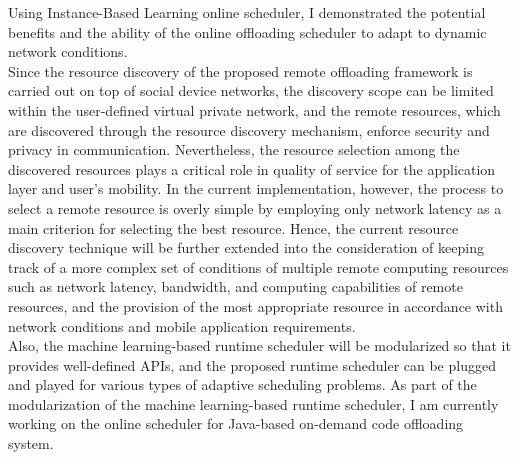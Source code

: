 %
Using Instance-Based Learning online scheduler, I demonstrated
the potential benefits and the ability of the online offloading
scheduler to adapt to dynamic network conditions.\\
%
Since the resource discovery of the proposed remote offloading framework
is carried out on top of social device networks, the discovery scope
can be limited within the user-defined virtual private network, and the
remote resources, which are discovered through the resource discovery
mechanism, enforce security and privacy in communication.
%
Nevertheless, the resource selection among the discovered resources
plays a critical role in quality of service for the application layer
and user's mobility.
%
In the current implementation, however, the process to select a
remote resource is overly simple by employing only network latency as a
main criterion for selecting the best resource.
%
Hence, the current resource discovery technique will be further extended
into the consideration of keeping track of a more complex set of
conditions of multiple remote computing resources such as network
latency, bandwidth, and computing capabilities of remote resources, and
the provision of the most appropriate resource in accordance with
network conditions and mobile application requirements.\\
%
Also, the machine learning-based runtime scheduler will be modularized
so that it provides well-defined APIs, and the proposed runtime scheduler
can be plugged and played for various types of adaptive scheduling
problems.
%
As part of the modularization of the machine learning-based runtime
scheduler, I am currently working on the online scheduler for Java-based
on-demand code offloading system.
%
